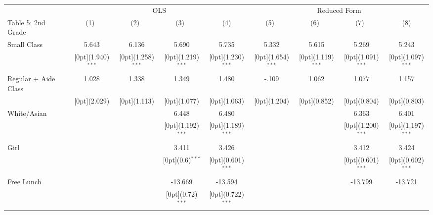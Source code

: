 \documentclass[a4paper,11pt]{article}
\begin{document}
\begin{table}[H]
	\setlength\tabcolsep{1.75pt} 
\begin{tabular*}{\textwidth}{@{\extracolsep{\fill}}lcccccccc}		
	& \multicolumn{4}{c}{OLS}  & \multicolumn{4}{c}{Reduced Form}\\
	\cline{2-5}	\cline{6-9}			
	Table 5: 2nd Grade & \multicolumn{1}{c}{(1)\mbox{\ }} &	\multicolumn{1}{c}{(2)\mbox{\ }} &	\multicolumn{1}{c}{(3)\mbox{\ }} &	\multicolumn{1}{c}{(4)} & \multicolumn{1}{c}{(5)\mbox{\ }} &	\multicolumn{1}{c}{(6)\mbox{\ }} &	\multicolumn{1}{c}{(7)\mbox{\ }} &	\multicolumn{1}{c}{(8)} \\
	\hline			
	Small Class &	5.643 &	6.136 &	5.690 &	5.735 &	5.332 &	5.615 &	5.269 &	5.243 \\
	&	\raisebox{.7ex}[0pt]{\scriptsize (1.940)$^{***}$} &	\raisebox{.7ex}[0pt]{\scriptsize (1.258)$^{***}$} &	\raisebox{.7ex}[0pt]{\scriptsize (1.219)$^{***}$} &	\raisebox{.7ex}[0pt]{\scriptsize (1.230)$^{***}$} 	&	\raisebox{.7ex}[0pt]{\scriptsize (1.654)$^{***}$} &	\raisebox{.7ex}[0pt]{\scriptsize (1.119)$^{***}$} &	\raisebox{.7ex}[0pt]{\scriptsize (1.091)$^{***}$} &	\raisebox{.7ex}[0pt]{\scriptsize (1.097)$^{***}$} \\
	Regular + Aide Class &	1.028 &	1.338 &	1.349 &	1.480  &	-.109 &	1.062 &	1.077 &	1.157 \\
	&	\raisebox{.7ex}[0pt]{\scriptsize (2.029)} &	\raisebox{.7ex}[0pt]{\scriptsize (1.113)} &	\raisebox{.7ex}[0pt]{\scriptsize (1.077)} &	\raisebox{.7ex}[0pt]{\scriptsize (1.063)} 	&	\raisebox{.7ex}[0pt]{\scriptsize (1.204)} &	\raisebox{.7ex}[0pt]{\scriptsize (0.852)} &	\raisebox{.7ex}[0pt]{\scriptsize (0.804)} &	\raisebox{.7ex}[0pt]{\scriptsize (0.803)} \\
	White/Asian &	&	&	6.448 &	6.480&	&	&	6.363 &	6.401 \\
	&	&	&	\raisebox{.7ex}[0pt]{\scriptsize (1.192)$^{***}$} &	\raisebox{.7ex}[0pt]{\scriptsize (1.189)$^{***}$} 
	&	&	&	\raisebox{.7ex}[0pt]{\scriptsize (1.200)$^{***}$} &	\raisebox{.7ex}[0pt]{\scriptsize (1.197)$^{***}$}\\
	Girl &	&	&	3.411 &	3.426 &	&	&	3.412 &	3.424\\
	&	&	&	\raisebox{.7ex}[0pt]{\scriptsize (0.6)$^{***}$} &	\raisebox{.7ex}[0pt]{\scriptsize (0.601)$^{***}$} &	&	&	\raisebox{.7ex}[0pt]{\scriptsize (0.601)$^{***}$} &	\raisebox{.7ex}[0pt]{\scriptsize (0.602)$^{***}$} \\
	Free Lunch &	&	&	-13.669 &	-13.594  &	&	&	-13.799 &	-13.721\\
	&	&	&	\raisebox{.7ex}[0pt]{\scriptsize (0.72)$^{***}$} &	\raisebox{.7ex}[0pt]{\scriptsize (0.722)$^{***}$} 

\end{tabular*}
\end{table}
\end{document}
